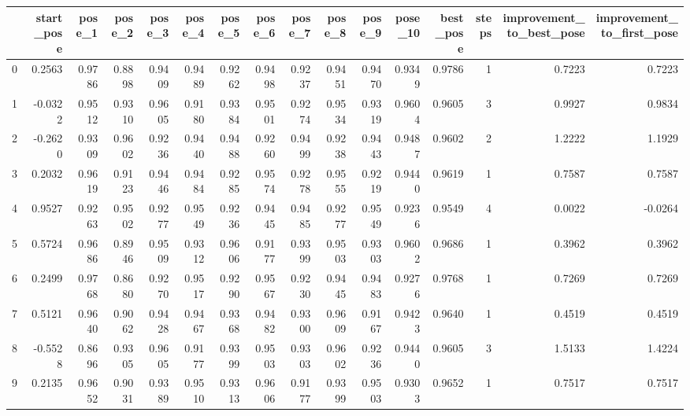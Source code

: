 \begin{tabular}{lrrrrrrrrrrrrrrr}
\toprule
{} &  start\_pose &  pose\_1 &  pose\_2 &  pose\_3 &  pose\_4 &  pose\_5 &  pose\_6 &  pose\_7 &  pose\_8 &  pose\_9 &  pose\_10 &  best\_pose &  steps &  improvement\_to\_best\_pose &  improvement\_to\_first\_pose \\
\midrule
0 &      0.2563 &  0.9786 &  0.8898 &  0.9409 &  0.9489 &  0.9262 &  0.9498 &  0.9237 &  0.9451 &  0.9470 &   0.9349 &     0.9786 &      1 &                    0.7223 &                     0.7223 \\
1 &     -0.0322 &  0.9512 &  0.9310 &  0.9605 &  0.9180 &  0.9384 &  0.9501 &  0.9274 &  0.9534 &  0.9319 &   0.9604 &     0.9605 &      3 &                    0.9927 &                     0.9834 \\
2 &     -0.2620 &  0.9309 &  0.9602 &  0.9236 &  0.9440 &  0.9488 &  0.9260 &  0.9499 &  0.9238 &  0.9443 &   0.9487 &     0.9602 &      2 &                    1.2222 &                     1.1929 \\
3 &      0.2032 &  0.9619 &  0.9123 &  0.9446 &  0.9484 &  0.9285 &  0.9574 &  0.9278 &  0.9555 &  0.9219 &   0.9440 &     0.9619 &      1 &                    0.7587 &                     0.7587 \\
4 &      0.9527 &  0.9263 &  0.9502 &  0.9277 &  0.9549 &  0.9236 &  0.9445 &  0.9485 &  0.9277 &  0.9549 &   0.9236 &     0.9549 &      4 &                    0.0022 &                    -0.0264 \\
5 &      0.5724 &  0.9686 &  0.8946 &  0.9509 &  0.9312 &  0.9606 &  0.9177 &  0.9399 &  0.9503 &  0.9303 &   0.9602 &     0.9686 &      1 &                    0.3962 &                     0.3962 \\
6 &      0.2499 &  0.9768 &  0.8680 &  0.9270 &  0.9517 &  0.9290 &  0.9567 &  0.9230 &  0.9445 &  0.9483 &   0.9276 &     0.9768 &      1 &                    0.7269 &                     0.7269 \\
7 &      0.5121 &  0.9640 &  0.9062 &  0.9428 &  0.9467 &  0.9368 &  0.9482 &  0.9300 &  0.9609 &  0.9167 &   0.9423 &     0.9640 &      1 &                    0.4519 &                     0.4519 \\
8 &     -0.5528 &  0.8696 &  0.9305 &  0.9605 &  0.9177 &  0.9399 &  0.9503 &  0.9303 &  0.9602 &  0.9236 &   0.9440 &     0.9605 &      3 &                    1.5133 &                     1.4224 \\
9 &      0.2135 &  0.9652 &  0.9031 &  0.9389 &  0.9510 &  0.9313 &  0.9606 &  0.9177 &  0.9399 &  0.9503 &   0.9303 &     0.9652 &      1 &                    0.7517 &                     0.7517 \\
\bottomrule
\end{tabular}
